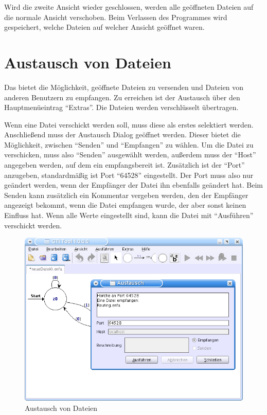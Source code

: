 Wird die zweite Ansicht wieder geschlossen, werden alle
geöffneten Dateien auf die normale Ansicht verschoben. Beim Verlassen des
Programmes wird gespeichert, welche Dateien auf welcher Ansicht geöffnet waren.


\section{Austausch von Dateien}

Das \gtitool bietet die Möglichkeit, geöffnete Dateien zu versenden und Dateien
von anderen \gtitool Benutzern zu empfangen. Zu erreichen ist der Austausch über
den Hauptmenüeintrag "`Extras"'. Die Dateien werden verschlüsselt
übertragen.\vspace{10pt}

Wenn eine Datei verschickt werden soll, muss diese als erstes selektiert werden.
Anschließend muss der Austausch Dialog geöffnet werden. Dieser bietet die
Möglichkeit, zwischen "`Senden"' und "`Empfangen"' zu wählen. Um die Datei zu
verschicken, muss also "`Senden"' ausgewählt werden, außerdem muss der "`Host"'
angegeben werden, auf dem ein \gtitool empfangsbereit ist. Zusätzlich ist der
"`Port"' anzugeben, standardmäßig ist Port "`64528"' eingestellt. Der Port muss
also nur geändert werden, wenn der Empfänger der Datei ihn ebenfalls geändert
hat. Beim Senden kann zusätzlich ein Kommentar vergeben werden, den der Empfänger
angezeigt bekommt, wenn die Datei empfangen wurde, der aber sonst keinen
Einfluss hat. Wenn alle Werte eingestellt sind, kann die Datei mit
"`Ausführen"' verschickt werden.\vspace{10pt}

\begin{figure}[h]
\begin{center}
\includegraphics[width=12cm]{../images/exchange.png}
\caption{Austausch von Dateien}
\end{center}
\end{figure}

